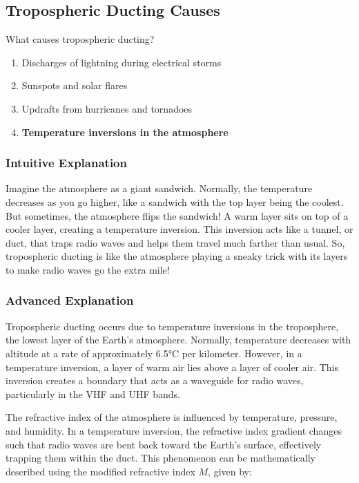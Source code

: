 \subsection{Tropospheric Ducting Causes}
\label{T3C08}

\begin{tcolorbox}[colback=gray!10!white,colframe=black!75!black,title=T3C08]
What causes tropospheric ducting?
\begin{enumerate}[label=\Alph*)]
    \item Discharges of lightning during electrical storms
    \item Sunspots and solar flares
    \item Updrafts from hurricanes and tornadoes
    \item \textbf{Temperature inversions in the atmosphere}
\end{enumerate}
\end{tcolorbox}

\subsubsection*{Intuitive Explanation}
Imagine the atmosphere as a giant sandwich. Normally, the temperature decreases as you go higher, like a sandwich with the top layer being the coolest. But sometimes, the atmosphere flips the sandwich! A warm layer sits on top of a cooler layer, creating a temperature inversion. This inversion acts like a tunnel, or duct, that traps radio waves and helps them travel much farther than usual. So, tropospheric ducting is like the atmosphere playing a sneaky trick with its layers to make radio waves go the extra mile!

\subsubsection*{Advanced Explanation}
Tropospheric ducting occurs due to temperature inversions in the troposphere, the lowest layer of the Earth's atmosphere. Normally, temperature decreases with altitude at a rate of approximately 6.5°C per kilometer. However, in a temperature inversion, a layer of warm air lies above a layer of cooler air. This inversion creates a boundary that acts as a waveguide for radio waves, particularly in the VHF and UHF bands.

The refractive index of the atmosphere is influenced by temperature, pressure, and humidity. In a temperature inversion, the refractive index gradient changes such that radio waves are bent back toward the Earth's surface, effectively trapping them within the duct. This phenomenon can be mathematically described using the modified refractive index \( M \), given by:

